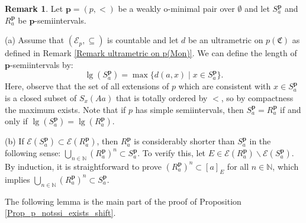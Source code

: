 \documentclass{amsart}
\theoremstyle{definition}
\theoremstyle{definition}
\newtheorem{Remark}[Theorem]{Remark}
\newcommand{\Mon}{\mathfrak C}
\def\pp{\mathbf{p}}
\DeclareMathOperator{\lgh}{lg}
\begin{document}
\begin{Remark} Let $\mathbf p=(p,<)$ be a weakly o-minimal pair over $\emptyset$ and let $S_a^\pp$ and $R_a^\pp$ be $\mathbf p$-semiintervals.

(a) Assume that $(\mathcal E_p,\subseteq)$ is countable and let $d$ be an ultrametric on $p(\Mon)$ as defined in Remark \ref{Remark ultrametric on p(Mon)}. We can define
the length of $\mathbf p$-semiintervals by: \[\lgh(S_a^\pp)=\max \{d(a,x)\mid x\in S_a^\pp\}.\] 
Here, observe that the set of all extensions of $p$ which are consistent with $x\in S^{\mathbf p}_a$ is a closed subset of $S_x(Aa)$ that is totally ordered by $<$, so by compactness the maximum exists. Note that if $p$ has simple semiintervals, then $S_a^\pp=R_a^\pp$ if and only if $\lgh(S_a^\pp)=\lgh(R_a^\pp)$.  

(b) If $\mathcal E(S_a^\pp)\subset \mathcal E(R_a^\pp)$, then $R_a^{\mathbf p}$ is considerably shorter than $S_a^{\mathbf p}$ in the following sense: $\bigcup_{n\in\mathbb N}(R^\pp_a)^n \subset S^\pp_a$. To verify this, let $E\in \mathcal E(R_a^\pp)\smallsetminus \mathcal E(S_a^\pp)$. By induction, it is straightforward to prove $(R^\pp_a)^n\subset [a]_E$ for all $n\in\mathbb N$, which implies $\bigcup_{n\in\mathbb N}(R^\pp_a)^n \subset S^\pp_a$. 
\end{Remark} 


The following lemma is the main part of the proof of Proposition \ref{Prop_p_notssi_exists_shift}.
\end{document}
